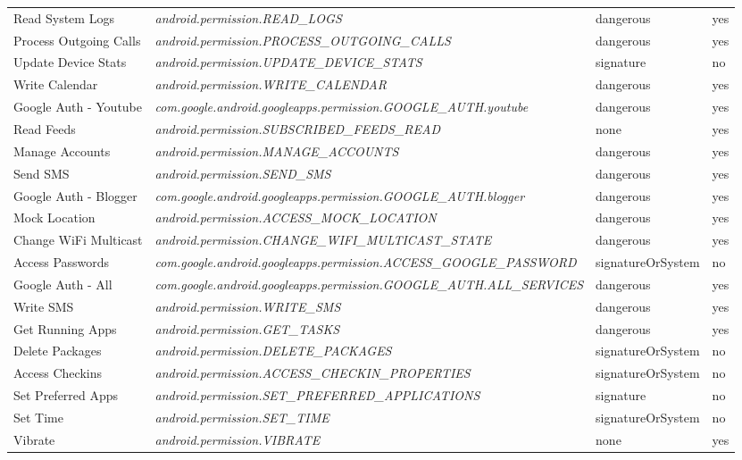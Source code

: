 \begin{small}
\begin{longtable}{p{3cm}|p{8cm}|p{2.5cm}|p{1.5cm}}
Read System Logs & \textit{android.permission.\-READ\_LOGS} & dangerous & yes \\
Process Outgoing Calls & \textit{android.permission.\-PROCESS\_OUTGOING\_CALLS} & dangerous & yes \\
Update Device Stats & \textit{android.permission.\-UPDATE\_DEVICE\_STATS} & signature & no \\
Write Calendar & \textit{android.permission.\-WRITE\_CALENDAR} & dangerous & yes \\
Google Auth - Youtube & \textit{com.google.android.googleapps.permission.\-GOOGLE\_AUTH.youtube} & dangerous & yes \\
Read Feeds & \textit{android.permission.\-SUBSCRIBED\_FEEDS\_READ} & none & yes \\
Manage Accounts & \textit{android.permission.\-MANAGE\_ACCOUNTS} & dangerous & yes \\
Send SMS & \textit{android.permission.\-SEND\_SMS} & dangerous & yes \\
Google Auth - Blogger & \textit{com.google.android.googleapps.permission.\-GOOGLE\_AUTH.blogger} & dangerous & yes \\
Mock Location & \textit{android.permission.\-ACCESS\_MOCK\_LOCATION} & dangerous & yes \\
Change WiFi Multicast & \textit{android.permission.\-CHANGE\_WIFI\_MULTICAST\_STATE} & dangerous & yes \\
Access Passwords & \textit{com.google.android.googleapps.permission.\-ACCESS\_GOOGLE\_PASSWORD} & signatureOrSystem & no \\
Google Auth - All & \textit{com.google.android.googleapps.permission.\-GOOGLE\_AUTH.ALL\_SERVICES} & dangerous & yes \\
Write SMS & \textit{android.permission.\-WRITE\_SMS} & dangerous & yes \\
Get Running Apps & \textit{android.permission.\-GET\_TASKS} & dangerous & yes \\
Delete Packages & \textit{android.permission.\-DELETE\_PACKAGES} & signatureOrSystem
 & no \\
Access Checkins & \textit{android.permission.\-ACCESS\_CHECKIN\_PROPERTIES} & signatureOrSystem & no \\
Set Preferred Apps & \textit{android.permission.\-SET\_PREFERRED\_APPLICATIONS} & signature & no \\
Set Time & \textit{android.permission.\-SET\_TIME} & signatureOrSystem & no \\
Vibrate & \textit{android.permission.\-VIBRATE} & none & yes \\

\end{longtable}
\end{small}
